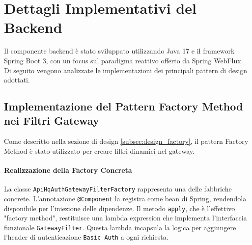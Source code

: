 \documentclass[12pt,a4paper,openright,twoside]{book}
\begin{document}
\section{Dettagli Implementativi del Backend}
\label{sec:impl_backend}
Il componente backend è stato sviluppato utilizzando Java 17 e il framework Spring Boot 3, con un focus sul paradigma reattivo offerto da Spring WebFlux. Di seguito vengono analizzate le implementazioni dei principali pattern di design adottati.

\subsection{Implementazione del Pattern Factory Method nei Filtri Gateway}
\label{subsec:impl_factory}
Come descritto nella sezione di design \ref{subsec:design_factory}, il pattern Factory Method è stato utilizzato per creare filtri dinamici nel gateway.

\paragraph{Realizzazione della Factory Concreta}
La classe \texttt{ApiHqAuthGatewayFilterFactory} rappresenta una delle fabbriche concrete. L'annotazione \texttt{@Component} la registra come bean di Spring, rendendola disponibile per l'iniezione delle dipendenze. Il metodo \texttt{apply}, che è l'effettivo "factory method", restituisce una lambda expression che implementa l'interfaccia funzionale \texttt{GatewayFilter}. Questa lambda incapsula la logica per aggiungere l'header di autenticazione \texttt{Basic Auth} a ogni richiesta.

%
%
%
\end{document}

